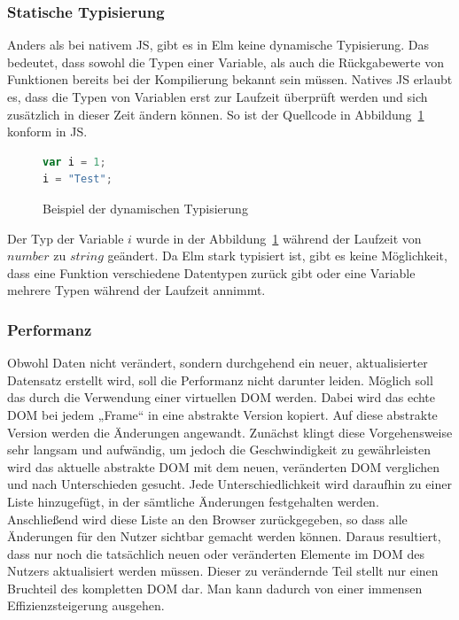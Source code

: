 \subsubsection{Statische Typisierung}
\label{sec:Statische Typisierung}
Anders als bei nativem \ac{JS}, gibt es in Elm keine dynamische Typisierung. Das bedeutet, dass sowohl die Typen einer Variable, als auch die Rückgabewerte von Funktionen bereits bei der Kompilierung bekannt sein müssen. Natives \ac{JS} erlaubt es, dass die Typen von Variablen erst zur Laufzeit überprüft werden und sich zusätzlich in dieser Zeit ändern können. So ist der Quellcode in Abbildung~\ref{fig:dynamische-typisierung} konform in \ac{JS}.
\begin{figure}[ht]
\begin{lstlisting}[language=JavaScript]
var i = 1;
i = "Test";
\end{lstlisting}
\caption{Beispiel der dynamischen Typisierung}\label{fig:dynamische-typisierung}
\end{figure}
Der Typ der Variable $i$ wurde in der Abbildung~\ref{fig:dynamische-typisierung} während der Laufzeit von $number$ zu $string$ geändert. Da Elm stark typisiert ist, gibt es keine Möglichkeit, dass eine Funktion verschiedene Datentypen zurück gibt oder eine Variable mehrere Typen während der Laufzeit annimmt.


\subsubsection{Performanz}
\label{sec:Performanz}
Obwohl Daten nicht verändert, sondern durchgehend ein neuer, aktualisierter Datensatz erstellt wird, soll die Performanz nicht darunter leiden. Möglich soll das durch die Verwendung einer virtuellen \ac{DOM} werden.
Dabei wird das echte \ac{DOM} bei jedem „Frame“ in eine abstrakte Version kopiert. Auf diese abstrakte Version werden die Änderungen angewandt. Zunächst klingt diese Vorgehensweise sehr langsam und aufwändig, um jedoch die Geschwindigkeit zu gewährleisten wird das aktuelle abstrakte \ac{DOM} mit dem neuen, veränderten \ac{DOM} verglichen und nach Unterschieden gesucht. Jede Unterschiedlichkeit wird daraufhin zu einer Liste hinzugefügt, in der sämtliche Änderungen festgehalten werden. Anschließend wird diese Liste an den Browser zurückgegeben, so dass alle Änderungen für den Nutzer sichtbar gemacht werden können. Daraus resultiert, dass nur noch die tatsächlich neuen oder veränderten Elemente im \ac{DOM} des Nutzers aktualisiert werden müssen. Dieser zu verändernde Teil stellt nur einen Bruchteil des kompletten \ac{DOM} dar. Man kann dadurch von einer immensen Effizienzsteigerung ausgehen.

